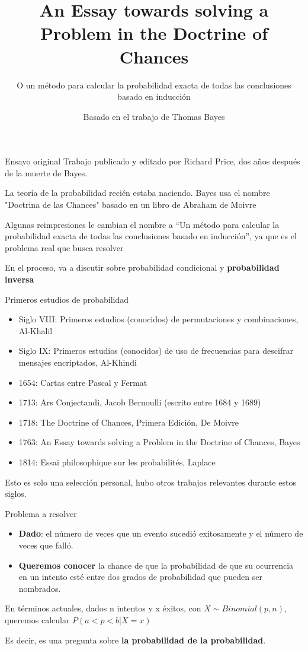 \documentclass{beamer}
\title{An Essay towards solving a Problem in the Doctrine of Chances}
\subtitle{O un método para calcular la probabilidad exacta de todas las conclusiones basado en inducción}
\author{Basado en el trabajo de Thomas Bayes}
\begin{document}
\begin{frame}[plain]
    \maketitle
\end{frame}

\begin{frame}{Ensayo original}
	Trabajo publicado y editado por Richard Price, dos años después de la muerte de Bayes.

	La teoría de la probabilidad recién estaba naciendo.
	Bayes usa el nombre "Doctrina de las Chances" basado en un libro de Abraham de Moivre

	Algunas reimpresiones le cambian el nombre a ``Un método para calcular la probabilidad exacta de todas las conclusiones basado en inducción'', ya que es el problema real que busca resolver

	En el proceso, va a discutir sobre probabilidad condicional y \textbf{probabilidad inversa}
\end{frame}

\begin{frame}{Primeros estudios de probabilidad}
  \begin{itemize}
    \item Siglo VIII: Primeros estudios (conocidos) de permutaciones y combinaciones, Al-Khalil
    \item Siglo IX: Primeros estudios (conocidos) de uso de frecuencias para descifrar mensajes encriptados, Al-Khindi
    \item 1654: Cartas entre Pascal y Fermat
    \item 1713: Ars Conjectandi, Jacob Bernoulli (escrito entre 1684 y 1689)
    \item 1718: The Doctrine of Chances, Primera Edición, De Moivre
    \item 1763: An Essay towards solving a Problem in the Doctrine of Chances, Bayes
    \item 1814: Essai philosophique sur les probabilités, Laplace
  \end{itemize}

  Esto es solo una selección personal, hubo otros trabajos relevantes durante estos siglos.
\end{frame}

\begin{frame}{Problema a resolver}
	\begin{itemize}
		\item \textbf{Dado}: el número de veces que un evento sucedió exitosamente y el número de veces que falló.
		\item \textbf{Queremos conocer} la chance de que la probabilidad de que su ocurrencia en un intento esté entre dos grados de probabilidad que pueden ser nombrados.
	\end{itemize}

	En términos actuales,
	dados n intentos y x éxitos, con $X \sim Binomial(p, n)$,
	queremos calcular $P(a < p < b | X = x)$

	Es decir, es una pregunta sobre \textbf{la probabilidad de la probabilidad}.
\end{frame}
\end{document}
